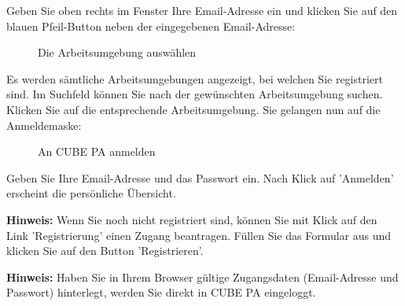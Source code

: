 Geben Sie oben rechts im Fenster Ihre Email-Adresse ein und klicken Sie auf den blauen Pfeil-Button neben der eingegebenen Email-Adresse:

\begin{figure}[H]
\caption{Die Arbeitsumgebung auswählen}
\end{figure}

Es werden sämtliche Arbeitsumgebungen angezeigt, bei welchen Sie registriert sind. Im Suchfeld können Sie nach der gewünschten Arbeitsumgebung suchen. Klicken Sie auf die entsprechende Arbeitsumgebung. Sie gelangen nun auf die Anmeldemaske:

\begin{figure}[H]
\caption{An CUBE PA anmelden}
\end{figure}

Geben Sie Ihre Email-Adresse und das Passwort ein. Nach Klick auf 'Anmelden' erscheint die persönliche Übersicht.

\vspace{\baselineskip}

\textbf{Hinweis:} Wenn Sie noch nicht registriert sind, können Sie mit Klick auf den Link 'Registrierung' einen Zugang beantragen. Füllen Sie das Formular aus und klicken Sie auf den Button 'Registrieren'.

\vspace{\baselineskip}

\textbf{Hinweis:} Haben Sie in Ihrem Browser gültige Zugangsdaten (Email-Adresse und Passwort) hinterlegt, werden Sie direkt in CUBE PA eingeloggt.


